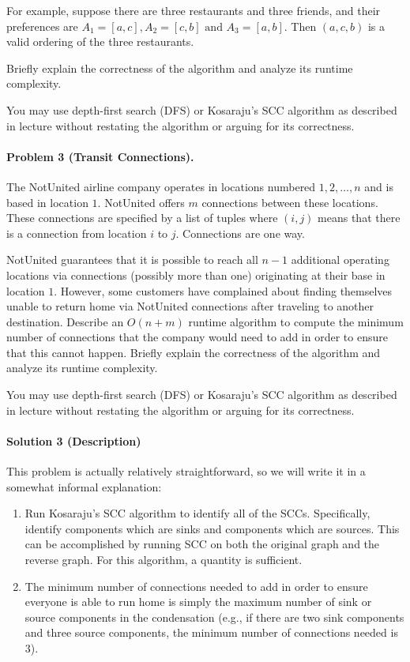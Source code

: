 \documentclass[11pt]{article}
\begin{document}
For example, suppose there are three restaurants and three friends, and their preferences are $A_1 = [a,c], A_2 = [c,b] \text{ and } A_3 = [a,b]$. Then $(a,c,b)$ is a valid ordering of the three restaurants.

Briefly explain the correctness of the algorithm and analyze its runtime complexity.

You may use depth-first search (DFS) or Kosaraju's SCC algorithm as described in lecture without restating the algorithm or arguing for its correctness.


\newpage
\paragraph{Problem 3 (Transit Connections).} The NotUnited airline company operates in locations numbered $1, 2, \dots, n$ and is based in location $1$. NotUnited offers $m$ connections between these locations. These connections are specified by a list of tuples where $(i, j)$ means that there is a connection from location $i$ to $j$. Connections are one way.

NotUnited guarantees that it is possible to reach all $n-1$ additional operating locations via connections (possibly more than one) originating at their base in location $1$. However, some customers have complained about finding themselves unable to return home via NotUnited connections after traveling to another destination. Describe an $O(n+m)$ runtime algorithm to compute the minimum number of connections that the company would need to add in order to ensure that this cannot happen. Briefly explain the correctness of the algorithm and analyze its runtime complexity.

You may use depth-first search (DFS) or Kosaraju's SCC algorithm as described in lecture without restating the algorithm or arguing for its correctness.

\paragraph{Solution 3 (Description)}

This problem is actually relatively straightforward, so we will write it in a somewhat informal explanation:

\begin{enumerate}
    \item Run Kosaraju's SCC algorithm to identify all of the SCCs. Specifically, identify components which are sinks and components which are sources. This can be accomplished by running SCC on both the original graph and the reverse graph. For this algorithm, a quantity is sufficient.
    \item The minimum number of connections needed to add in order to ensure everyone is able to run home is simply the maximum number of sink or source components in the condensation (e.g., if there are two sink components and three source components, the minimum number of connections needed is 3).
\end{enumerate}
\end{document}
